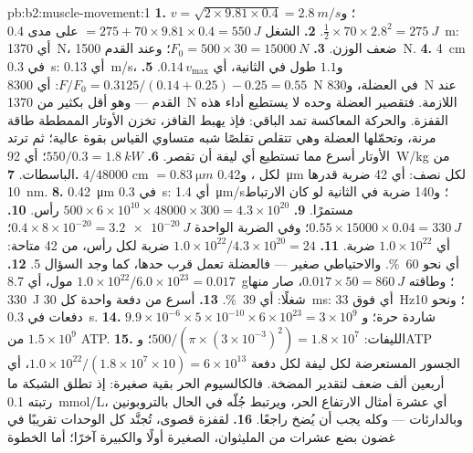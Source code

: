 \begin{solution}{pb:b2:muscle-movement:1}
\textbf{1.} $v = \sqrt{2\times 9.81\times 0.4} = \qty{2.8}{m/s}$؛
و$\tfrac12\times 70\times 2.8^{2} = \qty{275}{J}$.
\textbf{2.} الشغل $= 275 + 70\times 9.81\times 0.4 = \qty{550}{J}$ على مدى
\qty{0.4}{m}: أي \qty{1370}{N}، ضعف الوزن.
\textbf{3.} $F_0 = 500\times 30 = \qty{15000}{N}$؛ وعند القدم
\qty{1500}{N}.
\textbf{4.} \qty{4}{cm} في \qty{0.3}{s}: أي \qty{0.13}{m/s}، و$1.1$ طول في
الثانية، أي $0.14\,v_{\max}$.
\textbf{5.} $F/F_0 = 0.3125/(0.14 + 0.25) - 0.25 = 0.55$: أي \qty{8300}{N}
في العضلة، و\qty{830}{N} عند القدم --- وهو أقل بكثير من
\qty{1370}{N} اللازمة. فتقصير العضلة وحده لا يستطيع أداء هذه القفزة.
والحركة المعاكسة تمد الباقي: فإذ يهبط القافز، تخزن
الأوتار الممططة طاقة مرنة، وتحمّلها العضلة وهي تتقلص
تقلصًا شبه متساوي القياس بقوة عالية؛ ثم ترتد الأوتار
أسرع مما تستطيع أي ليفة أن تقصر.
\textbf{6.} $550/0.3 = \qty{1.8}{kW}$؛ أي \qty{92}{W/kg} من الباسطات.
\textbf{7.} $4/\num{48000}$ cm $= \qty{0.83}{\micro m}$ لكل ،
و\qty{0.42}{\micro m} لكل نصف: أي 42 ضربة قدرها \qty{10}{nm}.
\textbf{8.} \qty{0.42}{\micro m} في \qty{0.3}{s}: أي \qty{1.4}{\micro m/s}؛
و140 ضربة في الثانية لو كان الارتباط مستمرًا.
\textbf{9.} $500\times 6\times 10^{10}\times \num{48000}\times 300 =
4.3\times 10^{20}$ رأس.
\textbf{10.} $0.55\times \num{15000}\times 0.04 = \qty{330}{J}$؛ وفي
الضربة الواحدة $0.4\times 8\times 10^{-20} = \qty{3.2e-20}{J}$؛ أي $1.0\times
10^{22}$ ضربة.
\textbf{11.} $1.0\times 10^{22}/4.3\times 10^{20} = 24$ ضربة لكل
رأس، من 42 متاحة: أي نحو \qty{60}{\%}. والاحتياطي
صغير --- فالعضلة تعمل قرب حدها، كما وجد
السؤال 5.
\textbf{12.} $1.0\times 10^{22}/6.0\times 10^{23} = 0.017$ مول،
أي \qty{8.7}{g}؛ وطاقته $0.017\times 50 = \qty{860}{J}$، صار منها
\qty{330}{J} شغلًا: أي \qty{39}{\%}.
\textbf{13.} أسرع من دفعة واحدة كل \qty{30}{ms}: أي فوق
\qty{33}{Hz}؛ ونحو 10 دفعات في \qty{0.3}{s}.
\textbf{14.} $9.9\times 10^{-6}\times 5\times 10^{-10}\times 6\times
10^{23} = 3\times 10^{9}$ شاردة حرة؛ و$1.5\times 10^{9}$ من ATP.
\textbf{15.} الليفات: $500/(\pi\times(3\times 10^{-3})^{2}) = 1.8\times
10^{7}$؛ وATP الجسور المستعرضة لكل ليفة لكل دفعة $1.0\times
10^{22}/(1.8\times 10^{7}\times 10) = 6\times 10^{13}$، أي أربعين ألف
ضعف لتقدير المضخة. فالكالسيوم الحر بقية صغيرة: إذ
تطلق الشبكة ما رتبته \qty{0.1}{mmol/L}، أي عشرة
أمثال الارتفاع الحر، ويرتبط جُلّه في الحال بالتروبونين
وبالدارئات --- وكله يجب أن يُضخ راجعًا.
\textbf{16.} لقفزة قصوى، تُجنَّد كل الوحدات تقريبًا في غضون بضع عشرات
من المليثوان، الصغيرة أولًا والكبيرة آخرًا؛ أما الخطوة

\end{solution}
